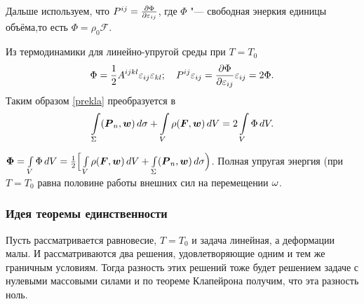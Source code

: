 Дальше используем, что $P^{ij} = \frac{\partial \Phi}{\partial \varepsilon_{ij}}$, где $\Phi$ "--- свободная энеркия единицы объёма,то есть $\Phi = \rho_0 \mathcal F$.

Из термодинамики для линейно-упругой среды при $T=T_0$ 
\[
  \Phi = \frac12 A^{ijkl} \varepsilon_{ij}\varepsilon_{kl};\quad
  P^{ij}\varepsilon_{ij} = \frac{\partial \Phi}{\partial \varepsilon_{ij}}\varepsilon_{ij} = 2\Phi.
\]
Таким образом \eqref{prekla} преобразуется в
\[
  \int\limits_{\Sigma}(\boldsymbol{P}_n,\boldsymbol{w})\,d\sigma + \int\limits_{V} \rho(\boldsymbol{F},\boldsymbol{w})\,dV = 2\int\limits_{V}\Phi\,dV.
\]

\begin{The}[Клапейрона]
  $\boldsymbol{\Phi} = \int\limits_{V}\Phi\,dV = \frac12 \Big[\int\limits_{V}\rho(\boldsymbol{F},\boldsymbol{w})\,dV + \int\limits_{\Sigma} (\boldsymbol{P}_n,\boldsymbol{w})\,d\sigma\Big)$. Полная упругая энергия (при $T=T_0$ равна половине работы внешних сил на перемещении $\omega$.
\end{The}

\subsubsection{Идея теоремы единственности}
Пусть рассматривается равновесие, $T=T_0$ и задача линейная, а деформации малы. И рассматриваются два решения, удовлетворяющие одним и тем же граничным условиям. Тогда разность этих решений тоже будет решением задаче с нулевыми массовыми силами и по теореме Клапейрона получим, что эта разность ноль.

